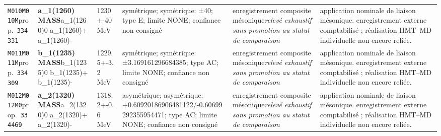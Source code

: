 \begin{landscape}
\begin{longtable}{L{1.85cm}L{4.45cm}L{2.35cm}L{4.05cm}L{3.35cm}L{7.15cm}}
\texttt{M010}\newline \texttt{M010M}\newline prop.\ \texttt{334331} & \textbf{a\_\allowbreak{}1(1260) MASS}\newline a\_\allowbreak{}1(1260)0 \textbar{}\allowbreak{} a\_\allowbreak{}1(1260)+ \textbar{}\allowbreak{} a\_\allowbreak{}1(1260)- & 1230+-40\,MeV & symétrique; symétrique: ±40; type E; limite NONE; confiance non consigné & enregistrement composite mésonique\newline \emph{relevé exhaustif sans promotion au statut de comparaison} & application nominale de liaison mésonique. enregistrement externe comptabilisé ; réalisation HMT--MD individuelle non encore reliée. \\
\texttt{M011}\newline \texttt{M011M}\newline prop.\ \texttt{334309} & \textbf{b\_\allowbreak{}1(1235) MASS}\newline b\_\allowbreak{}1(1235)0 \textbar{}\allowbreak{} b\_\allowbreak{}1(1235)+ \textbar{}\allowbreak{} b\_\allowbreak{}1(1235)- & 1229.5+-3.2\,MeV & symétrique; symétrique: ±3.169161296684385; type AC; limite NONE; confiance non consigné & enregistrement composite mésonique\newline \emph{relevé exhaustif sans promotion au statut de comparaison} & application nominale de liaison mésonique. enregistrement externe comptabilisé ; réalisation HMT--MD individuelle non encore reliée. \\
\texttt{M012}\newline \texttt{M012M0}\newline prop.\ \texttt{334469} & \textbf{a\_\allowbreak{}2(1320) MASS}\newline a\_\allowbreak{}2(1320)0 \textbar{}\allowbreak{} a\_\allowbreak{}2(1320)+ \textbar{}\allowbreak{} a\_\allowbreak{}2(1320)- & 1318.2+-0.6\,MeV & asymétrique; asymétrique: +0.60920186906481122/-0.60699292355954471; type AC; limite NONE; confiance non consigné & enregistrement composite mésonique\newline \emph{relevé exhaustif sans promotion au statut de comparaison} & application nominale de liaison mésonique. enregistrement externe comptabilisé ; réalisation HMT--MD individuelle non encore reliée. \\

\end{longtable}
\end{landscape}
